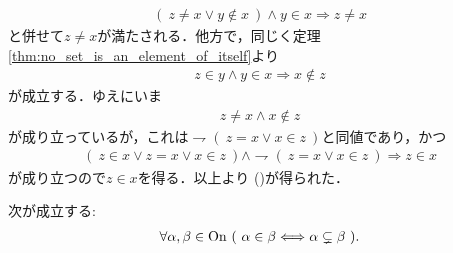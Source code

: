 \begin{prf}
\begin{align}
					(\ z \neq x \vee y \notin x\ ) \wedge y \in x
					\Longrightarrow z \neq x
				\end{align}
				と併せて$z \neq x$が満たされる．他方で，同じく定理\ref{thm:no_set_is_an_element_of_itself}より
				\begin{align}
					z \in y \wedge y \in x \Longrightarrow x \notin z
				\end{align}
				が成立する．ゆえにいま
				\begin{align}
					z \neq x \wedge x \notin z
				\end{align}
				が成り立っているが，これは$\rightharpoondown (\ z = x \vee x \in z\ )$と同値であり，かつ
				\begin{align}
					(\ z \in x \vee z = x \vee x \in z\ ) \wedge 
					\rightharpoondown (\ z = x \vee x \in z\ )
					\Longrightarrow z \in x
				\end{align}
				が成り立つので$z \in x$を得る．以上より
				()が得られた．
				\QED
	\end{prf}
	
	\begin{screen}
		\begin{thm}
		\label{thm:element_and_proper_subset_correspond_between_ordinal_numbers}
			次が成立する:
			\begin{align}
				\forall \alpha,\beta \in \ON\ 
				(\ \alpha \in \beta \Longleftrightarrow \alpha \subsetneq \beta\ ).
			\end{align}
		\end{thm}
	\end{screen}
	
